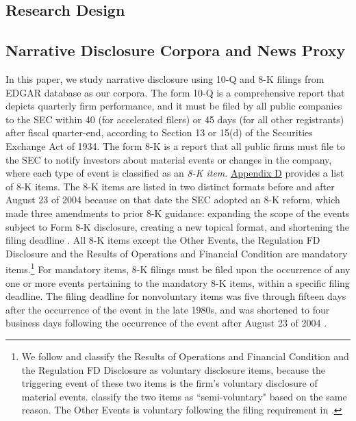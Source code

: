 \documentclass[a4paper]{article}
\begin{document}
\begin{spacing}{2}
\begin{comment}
Aligned with the prior literature on the usefulness of conservatism, we argue that more complete, news-consistent and timely disclosure of bad news relative to good news enhances contract efficiency [specific hypotheses to be developed]. However, we do not make claims about the valuation role of narrative conservatism.

\end{comment}

\section{Research Design}
\subsection{Narrative Disclosure Corpora and News Proxy} \label{sec3.1}
In this paper, we study narrative disclosure using 10-Q and 8-K filings from EDGAR database as our corpora. The form 10-Q is a comprehensive report that depicts quarterly firm performance, and it must be filed by all public companies to the SEC within 40 (for accelerated filers) or 45 days (for all other registrants) after fiscal quarter-end, according to Section 13 or 15(d) of the Securities Exchange Act of 1934. The form 8-K is a report that all public firms must file to the SEC to notify investors about material events or changes in the company, where each type of event is classified as an \textit{8-K item}. \hyperref[appd]{Appendix D} provides a list of 8-K items. The 8-K items are listed in two distinct formats before and after August 23 of 2004 because on that date the SEC adopted an 8-K reform, which made three amendments to prior 8-K guidance: expanding the scope of the events subject to Form 8-K disclosure, creating a new topical format, and shortening the filing deadline \cite{secFinalRuleAdditional2004, lermanNewForm8K2010}. All 8-K items except the Other Events, the Regulation FD Disclosure and the Results of Operations and Financial Condition are mandatory items.\footnote{We follow  and classify the Results of Operations and Financial Condition and the Regulation FD Disclosure as voluntary disclosure items, because the triggering event of these two items is the firm's voluntary disclosure of material events.  classify the two items as ``semi-voluntary" based on the same reason. The Other Events is voluntary following the filing requirement in . } For mandatory items, 8-K filings must be filed upon the occurrence of any one or more events pertaining to the mandatory 8-K items, within a specific filing deadline. The filing deadline for nonvoluntary items was five through fifteen days after the occurrence of the event in the late 1980s, and was shortened to four business days following the occurrence of the event after August 23 of 2004 \cite{lermanNewForm8K2010}.


\end{spacing}
\end{document}
